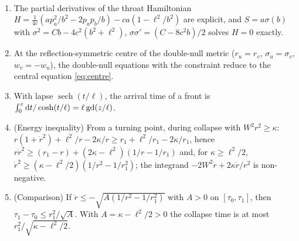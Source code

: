 \begin{proposition}\label{prop:altcollapse}\ver\
\begin{enumerate}[label=(\roman*)]
\item The partial derivatives of the throat Hamiltonian $H=\frac1{4c}(ap_a^2/b^2-2p_ap_b/b)-ca(1-\ell^2/b^2)$ are explicit, and $S=a\sigma(b)$ with $\sigma^2=Cb-4c^2(b^2+\ell^2)$, $\sigma\sigma'=(C-8c^2b)/2$ solves $H=0$ exactly.
\item At the reflection-symmetric centre of the double-null metric ($r_u=r_v$, $\sigma_u=\sigma_v$, $w_v=-w_u$), the double-null equations with the constraint reduce to the central equation \eqref{eq:centre}.
\item With lapse $\operatorname{sech}(t/\ell)$, the arrival time of a front is $\int_0^z\mathrm{d} t/\cosh(t/\ell)=\ell\operatorname{gd}(z/\ell)$.
\item (Energy inequality) From a turning point, during collapse with $W^2r^2\ge\kappa$: $r(1+\dot r^2)+\ell^2/r-2\kappa/r\ge r_1+\ell^2/r_1-2\kappa/r_1$, hence $r\dot r^2\ge(r_1-r)+(2\kappa-\ell^2)(1/r-1/r_1)$ and, for $\kappa\ge\ell^2/2$, $\dot r^2\ge(\kappa-\ell^2/2)(1/r^2-1/r_1^2)$; the integrand $-2W^2\dot r+2\kappa\dot r/r^2$ is non-negative.
\item (Comparison) If $\dot r\le-\sqrt{A(1/r^2-1/r_1^2)}$ with $A>0$ on $[\tau_0,\tau_1]$, then $\tau_1-\tau_0\le r_1^2/\sqrt A$. With $A=\kappa-\ell^2/2>0$ the collapse time is at most $r_1^2/\sqrt{\kappa-\ell^2/2}$.
\end{enumerate}
\end{proposition}
